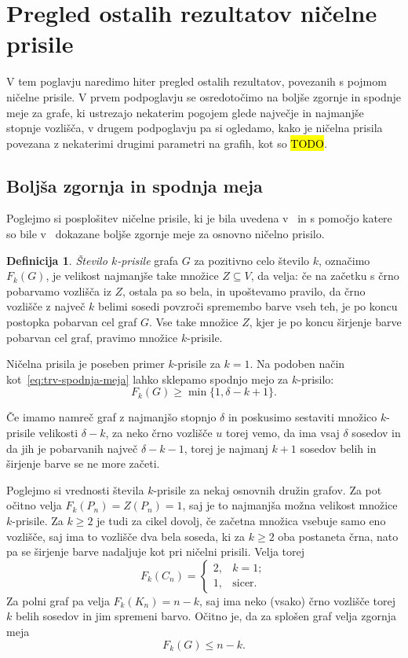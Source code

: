 \documentclass[12pt,a4paper,twoside]{article}
\theoremstyle{definition} %
\newtheorem{definicija}{Definicija}[section]
\theoremstyle{plain} %
\numberwithin{equation}{section}  %
\begin{document}
\section{Pregled ostalih rezultatov ničelne prisile}
V tem poglavju naredimo hiter pregled ostalih rezultatov, povezanih s pojmom ničelne prisile. V prvem podpoglavju se osredotočimo na boljše zgornje in spodnje meje za grafe, ki ustrezajo nekaterim pogojem glede največje in najmanjše stopnje vozlišča, v drugem podpoglavju pa si ogledamo, kako je ničelna prisila povezana z nekaterimi drugimi parametri na grafih, kot so  \hl{TODO}.

\subsection{Boljša zgornja in spodnja meja}
Poglejmo si posplošitev ničelne prisile, ki je bila uvedena v~\cite{amos2015kforcing} in s pomočjo katere so bile v~\cite{amos2015kforcing, gentner2018bounds} dokazane boljše zgornje meje za osnovno ničelno prisilo.
\begin{definicija}
    \label{def:k-prisila}
    \emph{Število $k$-prisile} grafa $G$ za pozitivno celo število $k$, označimo $F_k(G)$, je velikost najmanjše take množice $Z \subseteq V$, da velja: če na začetku s črno pobarvamo vozlišča iz $Z$, ostala pa so bela, in upoštevamo pravilo, da črno vozlišče z največ $k$ belimi sosedi povzroči spremembo barve vseh teh, je po koncu postopka pobarvan cel graf $G$. Vse take množice $Z$, kjer je po koncu širjenje barve pobarvan cel graf, pravimo množice $k$-prisile.
\end{definicija}

Ničelna prisila je poseben primer $k$-prisile za $k=1$. Na podoben način kot~\eqref{eq:trv-spodnja-meja} lahko sklepamo spodnjo mejo za $k$-prisilo:
\begin{equation}
    F_k(G) \geq \min\{1, \delta - k + 1\} .
    \label{eq:kprisila-trv-spodnja-meja}
\end{equation}

Če imamo namreč graf z najmanjšo stopnjo $\delta$ in poskusimo sestaviti množico $k$-prisile velikosti $\delta - k$, za neko črno vozlišče $u$ torej vemo, da ima vsaj $\delta$ sosedov in da jih je pobarvanih največ $\delta - k - 1$, torej je najmanj $k + 1$ sosedov belih in širjenje barve se ne more začeti.

Poglejmo si vrednosti števila $k$-prisile za nekaj osnovnih družin grafov. Za pot očitno velja $F_k(P_n) = Z(P_n) = 1$, saj je to najmanjša možna velikost množice $k$-prisile. Za $k \geq 2$ je tudi za cikel dovolj, če začetna množica vsebuje samo eno vozlišče, saj ima to vozlišče dva bela soseda, ki za $k \geq 2$ oba postaneta črna, nato pa se širjenje barve nadaljuje kot pri ničelni prisili. Velja torej
\[ F_k(C_n) =
\begin{cases}
    2, & k = 1; \\
    1, & \text{sicer.}
\end{cases}
\]
Za polni graf pa velja $F_k(K_n) = n-k$, saj ima neko (vsako) črno vozlišče torej $k$ belih sosedov in jim spremeni barvo. Očitno je, da za splošen graf velja zgornja meja
\[ F_k(G) \leq n - k .\]
\end{document}
